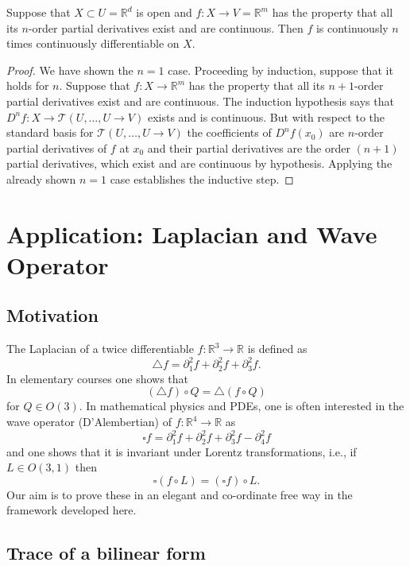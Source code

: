 \documentclass[twoside, a4paper, 10pt]{amsart}
\begin{document}
\begin{thm}  Suppose that $X \subset U = \mathbb{R}^d$ is open and $f:X \to V = \mathbb{R}^m$ has the property that all its $n$-order partial derivatives exist and are continuous. Then $f$ is continuously $n$ times continuously differentiable on $X$. \end{thm} 

\begin{proof} We have shown the $n=1$ case. Proceeding by induction, suppose that it holds for $n$. Suppose that $f:X \to \mathbb{R}^m$ has the property that all its $n+1$-order partial derivatives exist and are continuous. The induction hypothesis says that $D^nf: X \to \mathcal{T}( U, \ldots, U \to V)$ exists and is continuous. But with respect to the standard basis for $\mathcal{T}( U, \ldots, U \to V)$ the coefficients of $D^nf(x_0)$ are $n$-order partial derivatives of $f$ at $x_0$ and their partial derivatives are the order $(n+1)$ partial derivatives, which exist and are continuous by hypothesis. Applying the already shown $n=1$ case establishes the inductive step. \end{proof}

\section{Application: Laplacian and Wave Operator}

\subsection{Motivation}

The Laplacian of a twice differentiable $f:\mathbb{R}^3 \to \mathbb{R}$ is defined as $$\triangle f = \partial_{1}^2f + \partial_{2}^2f  + \partial_{3}^2f. $$ In elementary courses one shows that $$(\triangle f) \circ Q = \triangle (f \circ Q)$$ for $Q \in O(3)$. In mathematical physics and PDEs, one is often interested in the wave operator (D'Alembertian) of $f:\mathbb{R}^4 \to \mathbb{R}$ as $$ \square f = \partial_{1}^2f + \partial_{2}^2f  + \partial_{3}^2f  - \partial_{4}^2f  $$ and one shows that it is invariant under Lorentz transformations, i.e., if $L \in O(3,1)$ then $$\square(f \circ L) = (\square f) \circ L.$$ Our aim is to prove these in an elegant and co-ordinate free way in the framework developed here.

\subsection{Trace of a bilinear form}
\end{document}
